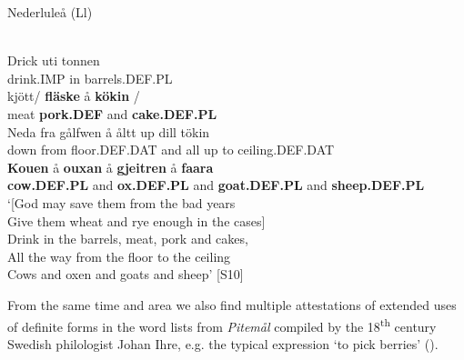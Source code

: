 
\item 

Nederluleå (Ll)



 \ea\label{}
\\

 \ea\label{}
\gll Drick  uti  tonnen\\


drink.IMP  in  barrels.DEF.PL\\

 \ea\label{}
\gll kjött/  \textbf{fläske}  å  \textbf{kökin}  /\\


meat  \textbf{pork.DEF} and  \textbf{cake.DEF.PL} \\

 \ea\label{}
\gll Neda  fra  gålfwen  å  åltt  up  dill  tökin\\


down  from  floor.DEF.DAT  and  all  up  to  ceiling.DEF.DAT\\

 \ea\label{}
\gll \textbf{Kouen} å  \textbf{ouxan} å  \textbf{gjeitren} å  \textbf{faara} \\


\textbf{cow.DEF.PL} and  \textbf{ox.DEF.PL} and  \textbf{goat.DEF.PL} and  \textbf{sheep.DEF.PL} \\

\glt ‘[God may save them from the bad years\\
Give them wheat and rye enough in the cases]\\
Drink in the barrels, meat, pork and cakes,\\
All the way from the floor to the ceiling\\
Cows and oxen and goats and sheep’ [S10]

\z

From the same time and area we also find multiple attestations of extended uses of definite forms in the word lists from \textit{Pitemål} compiled by the 18\textsuperscript{th} century Swedish philologist Johan Ihre, e.g. the typical expression ‘to pick berries’ (\citet{Reinhammar2002}).

